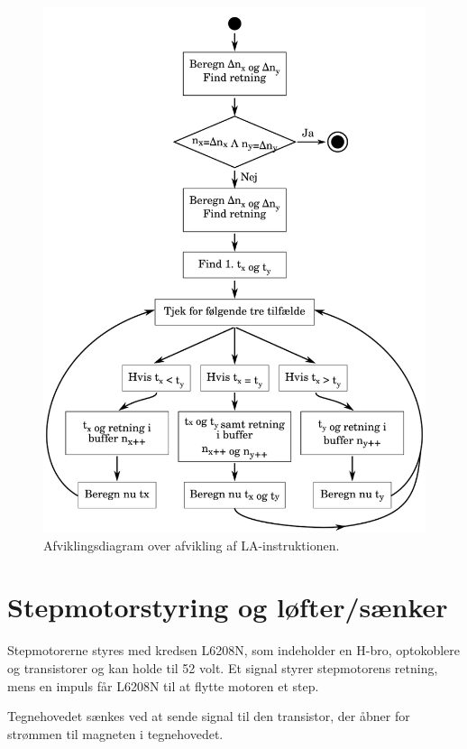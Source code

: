 \begin{figure}[htbp]
  \centering
  \includegraphics[width=.75\textwidth]{./img/la-behandling}
  \caption{Afviklingsdiagram over afvikling af LA-instruktionen.}
  \label{fig:la-behandling}
\end{figure}


\section{Stepmotorstyring og løfter/sænker}


Stepmotorerne styres med kredsen L6208N, som indeholder en H-bro,
optokoblere og transistorer og kan holde til 52 volt. Et signal styrer
stepmotorens retning, mens en impuls får L6208N til at flytte motoren
et step.

Tegnehovedet sænkes ved at sende signal til den transistor, der åbner
for strømmen til magneten i tegnehovedet.


